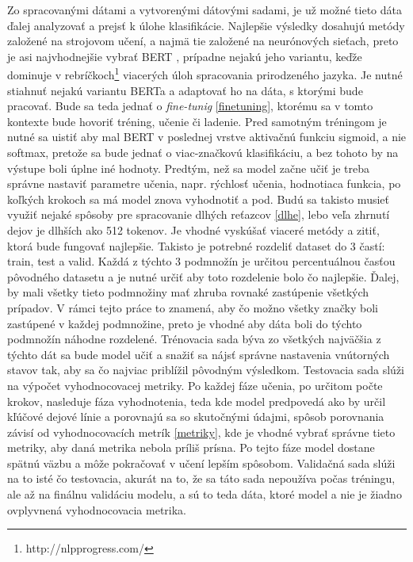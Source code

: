 Zo spracovanými dátami a vytvorenými dátovými sadami, je už možné tieto dáta ďalej analyzovať a prejsť k úlohe klasifikácie. Najlepšie výsledky dosahujú metódy založené na strojovom učení, a najmä tie založené na neurónových sieťach, preto je asi najvhodnejšie vybrať BERT \cite{Devlin:2018}, prípadne nejakú jeho variantu, keďže dominuje v rebríčkoch\footnote{http://nlpprogress.com/} viacerých úloh spracovania prirodzeného jazyka. Je nutné stiahnuť nejakú variantu BERTa a adaptovať ho na dáta, s ktorými bude pracovať. Bude sa teda jednať o \textit{fine-tunig} \ref{finetuning}, ktorému sa v tomto kontexte bude hovoriť tréning, učenie či ladenie. Pred samotným tréningom je nutné sa uistiť aby mal BERT v poslednej vrstve aktivačnú funkciu sigmoid, a nie softmax, pretože sa bude jednať o viac-značkovú klasifikáciu, a bez tohoto by na výstupe boli úplne iné hodnoty. Predtým, než sa model začne učiť je treba správne nastaviť parametre učenia, napr. rýchlosť učenia, hodnotiaca funkcia, po koľkých krokoch sa má model znova vyhodnotiť a pod. Budú sa takisto musieť využiť nejaké spôsoby pre spracovanie dlhých reťazcov \ref{dlhe}, lebo veľa zhrnutí dejov je dlhších ako 512 tokenov. Je vhodné vyskúšať viaceré metódy a zitiť, ktorá bude fungovať najlepšie. Takisto je potrebné rozdeliť dataset do 3 častí: train, test a valid. Každá z týchto 3 podmnožín je určitou percentuálnou časťou pôvodného datasetu a je nutné určiť aby toto rozdelenie bolo čo najlepšie. Ďalej, by mali všetky tieto podmnožiny mať zhruba rovnaké zastúpenie všetkých prípadov. V rámci tejto práce to znamená, aby čo možno všetky značky boli zastúpené v každej podmnožine, preto je vhodné aby dáta boli do týchto podmnožín náhodne rozdelené. Trénovacia sada býva zo všetkých najväčšia z týchto dát sa bude model učiť a snažiť sa nájsť správne nastavenia vnútorných stavov tak, aby sa čo najviac priblížil pôvodným výsledkom. Testovacia sada slúži na výpočet vyhodnocovacej metriky. Po každej fáze učenia, po určitom počte krokov, nasleduje fáza vyhodnotenia, teda kde model predpovedá ako by určil kľúčové dejové línie a porovnajú sa so skutočnými údajmi, spôsob porovnania závisí od vyhodnocovacích metrík \ref{metriky}, kde je vhodné vybrať správne tieto metriky, aby daná metrika nebola príliš prísna. Po tejto fáze model dostane spätnú väzbu a môže pokračovať v učení lepším spôsobom. Validačná sada slúži na to isté čo testovacia, akurát na to, že sa táto sada nepoužíva počas tréningu, ale až na finálnu validáciu modelu, a sú to teda dáta, ktoré model  a nie je žiadno ovplyvnená vyhodnocovacia metrika. 

